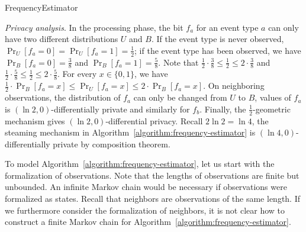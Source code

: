 \begin{algorithm}
  \begin{algorithmic}[1]
    \EndMatch
    \EndMatch
  \EndProcedure
  \end{algorithmic}
  \caption{FrequencyEstimator}
  \label{algorithm:frequency-estimator}
\end{algorithm}

\indent
\emph{Privacy analysis}.
In the processing phase, the bit $f_a$ for an event type $a$ can only
have two different distributions $U$ and $B$. If the event type is
never observed, $\Pr_U[f_a = 0] = \Pr_U[f_a = 1] = \frac{1}{2}$; if
the event type has been observed, we have $\Pr_B[f_a = 0] =
\frac{3}{8}$ and $\Pr_B[f_a = 1] = \frac{5}{8}$. Note that
$\frac{1}{2} \cdot \frac{3}{8} \leq \frac{1}{2} \leq 2 \cdot
\frac{3}{8}$ and $\frac{1}{2} \cdot \frac{5}{8} \leq \frac{1}{2} \leq
2 \cdot \frac{5}{8}$. For every $x \in \{ 0, 1 \}$, we have
$\frac{1}{2} \cdot \Pr_B[f_a = x] \leq \Pr_U[f_a = x] \leq 2 \cdot
\Pr_B[f_a = x]$. On neighboring observations, the distribution of
$f_a$ can only be changed from $U$ to $B$, values of $f_a$ is $(\ln 2,
0)$-differentially private and similarly for $f_b$. Finally, the
$\frac{1}{2}$-geometric mechanism gives $(\ln 2, 0)$-differential privacy.
Recall $2\ln 2 = \ln 4$,
the steaming mechanism in
Algorithm~\ref{algorithm:frequency-estimator} is $(\ln 4,
0)$-differentially private by
composition theorem.

To model Algorithm~\ref{algorithm:frequency-estimator}, let
us start with the formalization of observations. Note that the
lengths of observations are finite but unbounded. An infinite Markov
chain would be necessary if observations were formalized as states.
Recall that neighbors are observations of the same length. If we
furthermore consider the formalization of neighbors, it is not clear
how to construct a finite Markov chain for
Algorithm~\ref{algorithm:frequency-estimator}.

